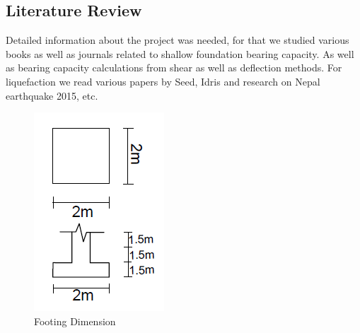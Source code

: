 \subsection{Literature Review}
Detailed information about the project was needed, for that we studied various books as well as journals related to shallow foundation bearing capacity. As well as bearing capacity calculations from shear as well as deflection methods. For liquefaction we read various papers by Seed, Idris and research on Nepal earthquake 2015, etc.

\begin{figure}
\centering
\includegraphics[width=\linewidth,keepaspectratio]{images/main/footing.png}
\caption{Footing Dimension}
\label{fsec}
\end{figure}
